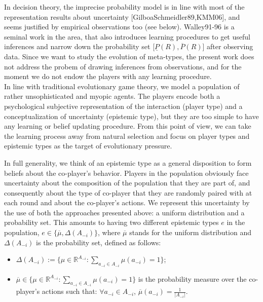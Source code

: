 \documentclass[fleqn,reqno,11pt]{article}
\begin{document}
In decision theory, the imprecise probability model is in line with most of the representation results about uncertainty [GilboaSchmeidler89,KMM06], and seems justified by empirical observations too (see below). Walley91-96 is a seminal work in the area, that also introduces learning procedures to get useful inferences and narrow down the probability set [$\underline{P}(R), \overline{P}(R)$] after observing data. Since we want to study the evolution of meta-types, the present work does not address the probem of drawing inferences from observations, and for the moment we do not endow the players with any learning procedure.\\
In line with traditional evolutionary game theory, we model a population of rather unsophisticated and myopic agents. %
The players encode both a psychological subjective representation of the interaction (player type) and a conceptualization of uncertainty (epistemic type), but they are too simple to have any learning or belief updating procedure. From this point of view, we can take the learning process away from natural selection and focus on player types and epistemic types as the target of evolutionary pressure.

In full generality, we think of an epistemic type as a general disposition to form beliefs about the co-player’s behavior.    Players in the population obviously face uncertainty about the composition of the population that they are part of, and consequently about the type of co-player that they are randomly paired with at each round and about the co-player's actions. We represent this uncertainty by the use of both the approaches presented above: a uniform distribution and a probability set. This amounts to having two different epistemic types $e$ in the population, $e \in \lbrace \overline{\mu}, \Delta(A_{-i}) \rbrace $, where $\overline{\mu}$ stands for the uniform distribution and $\Delta(A_{-i})$ is the probability set, defined as follows:

\begin{itemize}

\item $ \Delta(A_{-i}):=\lbrace \mu \in \mathbb{R}^{A_{-i}}: \sum_{a_{-i} \in A_{-i}} \mu(a_{-i}) = 1 \rbrace$;

\item $\overline{\mu} \in \lbrace \mu \in \mathbb{R}^{A_{-i}}: \sum_{a_{-i} \in A_{-i}} \mu(a_{-i}) = 1 \rbrace$ is the probability measure over the co-player's actions such that: $\forall a_{-i} \in A_{-i}$, $\overline{\mu}(a_{-i})= \frac{1}{|A_{-i}|}$.

\end{itemize} 
\end{document}
